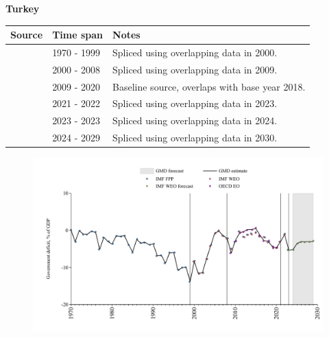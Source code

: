 \documentclass[12pt,a4paper,landscape]{article}
\begin{document}
\begin{adjustbox}{max totalsize={\paperwidth}{\paperheight},center}
\begin{minipage}[t][\textheight][t]{\textwidth}
\vspace*{0.5cm}
{}
\begin{center}
{\Large\bfseries Turkey}
\end{center}
\vspace{0.5cm}
\begin{table}[H]
\centering
\small
\begin{tabular}{|l|l|l|}
\hline
\textbf{Source} & \textbf{Time span} & \textbf{Notes} \\
\hline
\rowcolor{white}\cite{IMF_FPP}& 1970 - 1999 &Spliced using overlapping data in 2000.\\
\rowcolor{lightgray}\cite{IMF_WEO}& 2000 - 2008 &Spliced using overlapping data in 2009.\\
\rowcolor{white}\cite{OECD_EO}& 2009 - 2020 &Baseline source, overlaps with base year 2018.\\
\rowcolor{lightgray}\cite{IMF_WEO}& 2021 - 2022 &Spliced using overlapping data in 2023.\\
\rowcolor{white}\cite{IMF_FPP}& 2023 - 2023 &Spliced using overlapping data in 2024.\\
\rowcolor{lightgray}\cite{IMF_WEO_forecast}& 2024 - 2029 &Spliced using overlapping data in 2030.\\
\hline
\end{tabular}
\end{table}
\begin{figure}[H]
\centering
\includegraphics[width=\textwidth,height=0.6\textheight,keepaspectratio]{graphs/TUR_govdef_GDP.pdf}
\end{figure}
\end{minipage}
\end{adjustbox}
\end{document}
